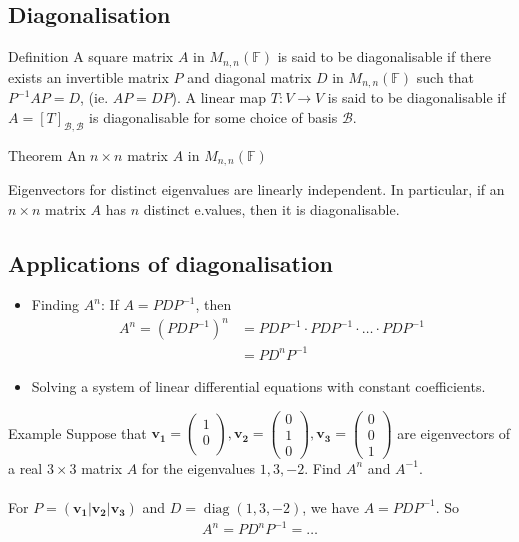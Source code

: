 \documentclass{report}
\renewcommand{\vec}{\mathbf}
\newcommand{\cvec}[1]{ \begin{pmatrix} #1 \end{pmatrix} }
\begin{document}
\begin{enumerate}
	\section{Diagonalisation}

		\begin{question}{Definition}
			A square matrix $A$ in $M_{n,n}(\mathbb{F})$ is said to be diagonalisable if there exists an invertible matrix $P$ and diagonal matrix $D$ in $M_{n,n}(\mathbb{F})$ such that $P^{-1}AP = D$, (ie. $AP = DP$). A linear map $T:V \to V$ is said to be diagonalisable if $A = [T]_{\mathcal{B},\mathcal{B}}$ is diagonalisable for some choice of basis $\mathcal{B}$.
		\end{question}

		\begin{question}{Theorem}
			An $n \times n$ matrix $A$ in $M_{n,n}(\mathbb{F})$ %
		\end{question}

		Eigenvectors for distinct eigenvalues are linearly independent. In particular, if an $n \times n$ matrix $A$ has $n$ distinct e.values, then it is diagonalisable.

		\subsection{Applications of diagonalisation}

			\begin{itemize}
				\item Finding $A^n$: If $A = PDP^{-1}$, then
					\begin{align*}
						A^n = (PDP^{-1})^n &= PDP^{-1} \cdot PDP^{-1} \cdot \dots \cdot PDP^{-1}	\\
										   &= PD^nP^{-1}
					\end{align*}
				\item Solving a system of linear differential equations with constant coefficients.
			\end{itemize}

			\begin{question}{Example}
				Suppose that $\vec{v_1} = \cvec{1\\0\\}, \vec{v_2} = \cvec{0\\1\\0}, \vec{v_3} = \cvec{0\\0\\1}$ are eigenvectors of a real $3 \times 3$ matrix $A$ for the eigenvalues $1,3,-2$. Find $A^n$ and $A^{-1}$.
				\\ \\
				For $P = (\vec{v_1}|\vec{v_2}|\vec{v_3})$ and $D = \operatorname{diag}(1,3,-2)$, we have $A = PDP^{-1}$. So
				\begin{align*}
					A^n = PD^nP^{-1} = \dots
				\end{align*}
			\end{question}


\end{enumerate}
\end{document}
